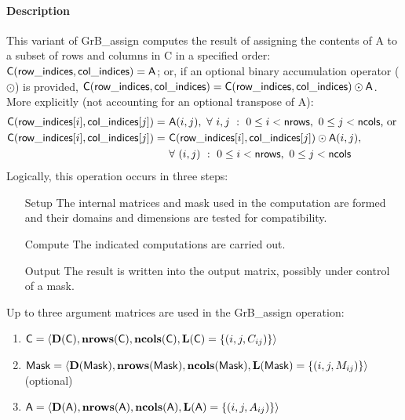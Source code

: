 \paragraph{Description}

This variant of {\sf GrB\_assign} computes the result of assigning the contents
of {\sf A} to a subset of rows and columns in {\sf C} in a specified order:
${\sf C}({\sf row\_indices, col\_indices}) = {\sf A}$; or, if an optional
binary accumulation operator ($\odot$) is provided, 
${\sf C}({\sf row\_indices},{\sf col\_indices}) = 
{\sf C}({\sf row\_indices},{\sf col\_indices}) \odot {\sf A}$.
More explicitly (not accounting for an optional transpose of {\sf A}):
\[
\begin{aligned}
  	{\sf C}({\sf row\_indices}[i],{\sf col\_indices}[j]) = &\ {\sf A}(i,j), 
 	\ \forall \ i,j \ : \ 0 \leq i < {\sf nrows},\ 0 \leq j < {\sf ncols} \mbox{,~or~} \\
  	{\sf C}({\sf row\_indices}[i],{\sf col\_indices}[j]) = &\ 
    {\sf C}({\sf row\_indices}[i],{\sf col\_indices}[j]) \odot {\sf A}(i,j), \\
 	& \ \forall \ (i,j) \ : \ 0 \leq i < {\sf nrows},\ 0 \leq j < {\sf ncols}
\end{aligned}
\]  
Logically, this operation occurs in three steps:
\begin{enumerate}[leftmargin=0.85in]
\item[Setup] The internal matrices and mask used in the computation are formed 
and their domains and dimensions are tested for compatibility.
\item[Compute] The indicated computations are carried out.
\item[Output] The result is written into the output matrix, possibly under 
control of a mask.
\end{enumerate}

Up to three argument matrices are used in the {\sf GrB\_assign} operation:
\begin{enumerate}
	\item ${\sf C} = \langle \bold{D}({\sf C}),\bold{nrows}({\sf C}),
    \bold{ncols}({\sf C}),\bold{L}({\sf C}) = \{(i,j,C_{ij}) \} \rangle$

	\item ${\sf Mask} = \langle \bold{D}({\sf Mask}),\bold{nrows}({\sf Mask}),
    \bold{ncols}({\sf Mask}),\bold{L}({\sf Mask}) = \{(i,j,M_{ij}) \} \rangle$ (optional)

	\item ${\sf A} = \langle \bold{D}({\sf A}),\bold{nrows}({\sf A}),
    \bold{ncols}({\sf A}),\bold{L}({\sf A}) = \{(i,j,A_{ij}) \} \rangle$
\end{enumerate}

